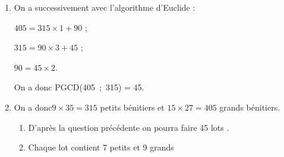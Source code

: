 
\medskip

\begin{enumerate}
\item %
On a successivement avec l'algorithme d'Euclide :

$405 = 315 \times 1 + 90$ ;

$315 = 90 \times 3 + 45$ ; 

$90 = 45 \times 2$.

On a donc  PGCD(405~;~315) = 45.
\item %
 
 
On a donc$9\times 35 = 315$ petits bénitiers et $15 \times 27 = 405$ grands bénitiers.
	\begin{enumerate}
		\item %
D'après la question précédente on pourra faire 45 lots . 
		\item %
Chaque lot contient  7 petits et 9 grands 
	\end{enumerate}
\end{enumerate}

\bigskip

